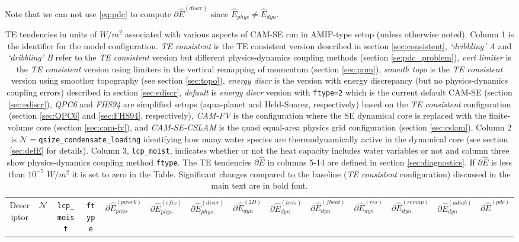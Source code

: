 \documentclass{agujournal}
\newcommand*{\gi}[1]{\widehat{#1}}
\begin{document}
Note that we can not use \eqref{eq:pdc} to compute $\partial \gi{E}^{({discr})}$ since $\gi{E}_{phys}\neq \gi{E}_{dyn}$.
%
\begin{table}
\caption{TE tendencies in units of $W/m^2$ associated with various aspects of CAM-SE run in AMIP-type setup (unless otherwise noted). Column 1 is the identifier for the model configuration. {\em{TE consistent}} is the TE consistent version described in section \ref{sec:consistent}, {\em{`dribbling' A}} and {\em{`dribbling' B}} refer to the {\em{TE consistent}} version but different physics-dynamics coupling methods (section \ref{se:pdc_problem}), {\em{vert limiter}} is the {\em{TE consistent}} version using limiters in the vertical remapping of momentum (section \ref{sec:ppm}), {\em{smooth topo}} is the {\em{TE consistent}} version using smoother topography (see section \ref{sec:topo}), {\em{energy discr}} is the version with energy discrepancy (but no physics-dynamics coupling errors) described in section \ref{sec:ediscr}, {\em{default}} is {\em{energy discr}} version with {\tt{ftype=2}} which is the current default CAM-SE (section \ref{sec:ediscr}), {\em{QPC6}} and {\em{FHS94}} are simplified setups (aqua-planet and Held-Suarez, respectively) based on the {\em{TE consistent}} configuration (section \ref{sec:QPC6} and \ref{sec:FHS94}, respectively), {\em{CAM-FV}} is the configuration where the SE dynamical core is replaced with the finite-volume core (section \ref{sec:cam-fv}), and {\em{CAM-SE-CSLAM}} is the quasi equal-area physics grid configuration (section \ref{sec:cslam}). Column 2 is $\mathcal{N}=${\tt{qsize\_condensate\_loading}} identifying how many water species are thermodynamically active in the dynamical core (see section \ref{sec:defE} for details). Column 3, {\tt{lcp\_moist}}, indicates whether or not the heat capacity includes water variables or not and column three show physics-dynamics coupling method {\tt{ftype}}. The TE tendencies $\partial \gi{E}$ in columns 5-14 are defined in section \ref{sec:diagnostics}. If $\partial \gi{E}$ is less than $10^{-5}$ $W/m^2$ it is set to zero in the Table. Significant changes compared to the baseline ({\em{TE consistent}} configuration) discussed in the main text are in bold font.}
\label{table:TE}
\begin{tabular}{c|ccc|ccc|cccccc|c}
Descriptor & $\mathcal{N}$ & {\tt{lcp\_moist}} &  {\tt{ftype}}  & $\partial \gi{E}_{phys}^{({pwork})}$ &  $\partial \gi{E}_{phys}^{({efix})}$ &  $\partial \gi{E}_{phys}^{({discr})}$ &  $\partial \gi{E}_{dyn}^{({2D})}$ & $\partial \gi{E}_{dyn}^{({hvis})}$ & $\partial \gi{E}_{dyn}^{({fheat})}$ & $\partial \gi{E}_{dyn}^{(res)}$ & $\partial \gi{E}_{dyn}^{(remap)}$ & $\partial \gi{E}_{dyn}^{(adiab)}$  & $\partial \gi{E}^{(pdc)}$\\

\end{tabular}
\end{table}
\end{document}
